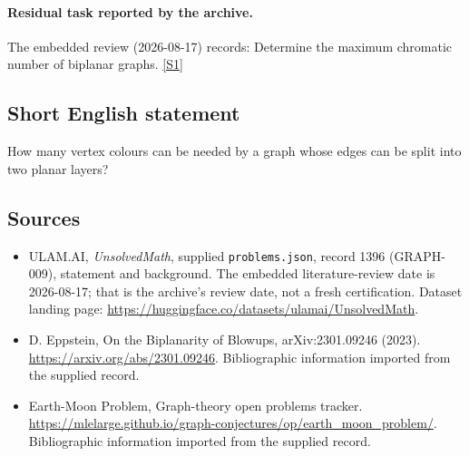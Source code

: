 \documentclass[11pt,a4paper]{article}
\newcommand{\sref}[2]{\hyperlink{source:#1:#2}{[S#2]}}
\begin{document}
\paragraph{Residual task reported by the archive.}

The embedded review (2026-08-17) records: Determine the maximum chromatic number of biplanar graphs. \sref{1396}{1}

\subsection{Short English statement}

How many vertex colours can be needed by a graph whose edges can be split into two planar layers?

\subsection{Sources}

{\small

\begin{itemize}

\item[\hypertarget{source:1396:1}{S1}] ULAM.AI, \emph{UnsolvedMath}, supplied \texttt{problems.json}, record 1396 (GRAPH-009), statement and background. The embedded literature-review date is 2026-08-17; that is the archive’s review date, not a fresh certification. Dataset landing page: \url{https://huggingface.co/datasets/ulamai/UnsolvedMath}.

\item[\hypertarget{source:1396:2}{S2}] D. Eppstein, On the Biplanarity of Blowups, arXiv:2301.09246 (2023). \url{https://arxiv.org/abs/2301.09246}. Bibliographic information imported from the supplied record.

\item[\hypertarget{source:1396:3}{S3}] Earth-Moon Problem, Graph-theory open problems tracker. \url{https://mlelarge.github.io/graph-conjectures/op/earth_moon_problem/}. Bibliographic information imported from the supplied record.

\end{itemize}

}

\label{end:1396}
\end{document}
